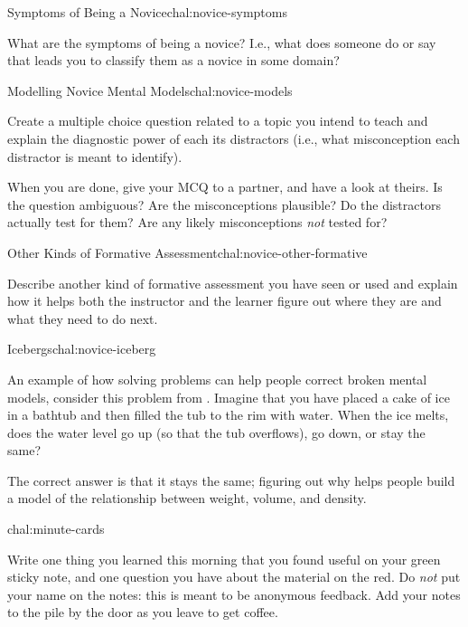 \begin{challenge}{Symptoms of Being a Novice}{chal:novice-symptoms}

What are the symptoms of being a novice?  I.e., what does someone do
or say that leads you to classify them as a novice in some domain?

\end{challenge}

\begin{challenge}{Modelling Novice Mental Models}{chal:novice-models}

Create a multiple choice question related to a topic you intend to teach
and explain the diagnostic power of each its distractors (i.e., what
misconception each distractor is meant to identify).

When you are done, give your MCQ to a partner, and have a look at
theirs.  Is the question ambiguous?  Are the misconceptions plausible?
Do the distractors actually test for them?  Are any likely
misconceptions \emph{not} tested for?

\end{challenge}

\begin{challenge}{Other Kinds of Formative Assessment}{chal:novice-other-formative}

Describe another kind of formative assessment you have seen or used and
explain how it helps both the instructor and the learner figure out
where they are and what they need to do next.

\end{challenge}

\begin{challenge}{Icebergs}{chal:novice-iceberg}

An example of how solving problems can help people correct broken
mental models, consider this problem
from \cite{bib:epstein-thinking-physics}.  Imagine that you have
placed a cake of ice in a bathtub and then filled the tub to the rim
with water. When the ice melts, does the water level go up (so that
the tub overflows), go down, or stay the same?


The correct answer is that it stays the same; figuring out why helps
people build a model of the relationship between weight, volume, and
density.

\end{challenge}

\begin{challenge}{chal:minute-cards}

Write one thing you learned this morning that you found useful on your
green sticky note, and one question you have about the material on the
red. Do \emph{not} put your name on the notes: this is meant to be
anonymous feedback. Add your notes to the pile by the door as you leave
to get coffee.

\end{challenge}
